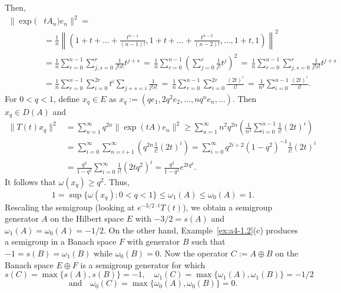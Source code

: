 \begin{example}
Then,
\begin{align*}
\|\exp(&t A_n) e_n\|^2 = \\
&= \frac{1}{n} \left\| (1 + t + \dots + \frac{t^{n-1}}{(n-1)!}, 1 + t + \dots + \frac{t^{n-2}}{(n-2)!}, \dots, 1+t, 1) \right\|^2 \\
&=
\frac{1}{n} \sum_{r=0}^{n-1} \sum_{j,s=0}^{r} \frac{1}{j!s!} t^{j+s} \, = \,
\frac{1}{n} \sum_{r=0}^{n-1} \left(\sum_{j=0}^{r} \frac{1}{j!} t^j \right)^2 
\, = \, \frac{1}{n} \sum_{r=0}^{n-1} \sum_{j,s=0}^{r} \frac{1}{j!s!} t^{j+s} \\
&= 
\frac{1}{n} \sum_{r=0}^{n-1} \sum_{i=0}^{2r} t^i \sum_{j+s=i} \frac{1}{j!s!} \,
= \, 
\frac{1}{n} \sum_{r=0}^{n-1} \sum_{i=0}^{2r} \frac{(2t)^i}{i!} \,  = \,  \frac{1}{n^2} \sum_{i=0}^{n-1} \frac{(2t)^i}{i!}.
\end{align*}
 For $ 0 < q < 1 $, define $ x_q \in E $ as  
$
x_q := (q e_1, 2q^2 e_2, ..., n q^n e_n, ...).
$
Then $x_q \in D(A)$ and
\begin{align*}
\|T(t)x_q\|^2 & = \sum_{n=1}^{\infty} q^{2n} \| \exp(t A) e_n \|^2
\geq \sum_{n=1}^{\infty} n^2 q^{2n} \left(\frac{1}{n^2} \sum_{i=0}^{n-1}  \frac{1}{i!} (2t)^i \right)\\
&= \sum_{i=0}^{\infty} \sum_{n=i+1}^{\infty} \left( q^{2n} \frac{1}{i!} (2t)^i \right)
= \sum_{i=0}^{\infty} q^{2i+2} (1 - q^2)^{-1} \frac{1}{i!} (2t)^i \\
&= \frac{q^2}{1 - q^2} \sum_{i=0}^{\infty} \frac{1}{i!} (2t q^2)^i
= \frac{q^2}{1 - q^2} e^{2t q^2}.
\end{align*}
It follows that $\omega(x_q) \geq q^2$. 
Thus,
\[
1 = \sup \{\omega(x_q)\colon0 < q < 1\} \leq \omega_1(A) \leq \omega_{0}(A) = 1.
\]
Rescaling the semigroup (\ie looking at $e^{-3/2 \cdot t} T(t)$), we obtain a semigroup generator $A$ on the Hilbert space $E$ with $-3/2 = s(A)$ and $\omega_1(A) = \omega_{0}(A) = -1/2$. 
On the other hand, Example~\ref{ex:a4-1.2}(c) produces a semigroup in a Banach space $F$ with generator $B$ such that $-1 = s(B) = \omega_1(B)$ while $\omega_{0}(B) = 0$. 
Now the operator $C := A \oplus B$ on the Banach space $E \oplus F$ is a semigroup generator for which
\[
s(C) = \max \{s(A), s(B)\} = -1, \quad \omega_1(C) = \max\{\omega_1(A), \omega_1(B)\} = -1/2
\]
\[
\text{and} \quad \omega_{0}(C) = \max\{\omega_{0}(A), \omega_{0}(B)\} = 0.
\]
\end{example}
